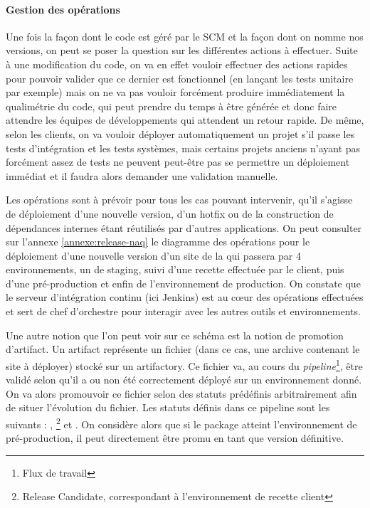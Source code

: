 \paragraph{Gestion des opérations}

Une fois la façon dont le code est géré par le \gls{SCM} et la façon dont on nomme nos versions, on peut se poser la question sur les différentes actions à effectuer. Suite à une modification du code, on va en effet vouloir effectuer des actions rapides pour pouvoir valider que ce dernier est fonctionnel (en lançant les tests unitaire par exemple) mais on ne va pas vouloir forcément produire immédiatement la qualimétrie du code, qui peut prendre du temps à être générée et donc faire attendre les équipes de développements qui attendent un retour rapide. De même, selon les clients, on va vouloir déployer automatiquement un projet s'il passe les tests d'intégration et les tests systèmes, mais certains projets anciens n'ayant pas forcément assez de tests ne peuvent peut-être pas se permettre un déploiement immédiat et il faudra alors demander une validation manuelle.

Les opérations sont à prévoir pour tous les cas pouvant intervenir, qu'il s'agisse de déploiement d'une nouvelle version, d'un \gls{hotfix} ou de la construction de dépendances internes étant réutilisés par d'autres applications. On peut consulter sur l'annexe \ref{annexe:release-naq} le diagramme des opérations pour le déploiement d'une nouvelle version d'un site de la \naq{} qui passera par 4 environnements, un de staging, suivi d'une recette effectuée par le client, puis d'une pré-production et enfin de l'environnement de production. On constate que le serveur d'intégration continu (ici Jenkins) est au cœur des opérations effectuées et sert de chef d'orchestre pour interagir avec les autres outils et environnements.

Une autre notion que l'on peut voir sur ce schéma est la notion de promotion d'artifact. Un artifact représente un fichier (dans ce cas, une archive contenant le site à déployer) stocké sur un \gls{artifactory}. Ce fichier va, au cours du \emph{pipeline}\footnote{Flux de travail}, être validé selon qu'il a ou non été correctement déployé sur un environnement donné. On va alors promouvoir ce fichier selon des statuts prédéfinis arbitrairement afin de situer l'évolution du fichier. Les statuts définis dans ce pipeline sont les suivants : , \footnote{Release Candidate, correspondant à l'environnement de recette client} et . On considère alors que si le package atteint l'environnement de pré-production, il peut directement être promu en tant que version définitive.

